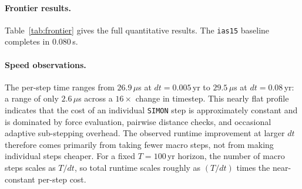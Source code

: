 \documentclass[12pt]{article}
\begin{document}
\paragraph{Frontier results.}
Table~\ref{tab:frontier} gives the full quantitative results.
The \texttt{ias15} baseline completes in $0.080$\,s.

\begin{table}[H]
\centering
\caption{Speed--accuracy frontier results for \texttt{SIMON} on IC1 over $T=100$\,yr.
Accuracy is time-averaged RMS deviation from \texttt{ias15}.}
\label{tab:frontier}
\end{table}

\paragraph{Speed observations.}
The per-step time ranges from $26.9\,\mu$s at $dt=0.005$\,yr to
$29.5\,\mu$s at $dt=0.08$\,yr: a range of only $2.6\,\mu$s across
a $16\times$ change in timestep. This nearly flat profile indicates
that the cost of an individual \texttt{SIMON} step is approximately
constant and is dominated by force evaluation, pairwise distance
checks, and occasional adaptive sub-stepping overhead. The observed
runtime improvement at larger $dt$ therefore comes primarily from
taking fewer macro steps, not from making individual steps cheaper.
For a fixed $T=100$\,yr horizon, the number of macro steps scales
as $T/dt$, so total runtime scales roughly as $(T/dt)$ times the
near-constant per-step cost.
\end{document}
